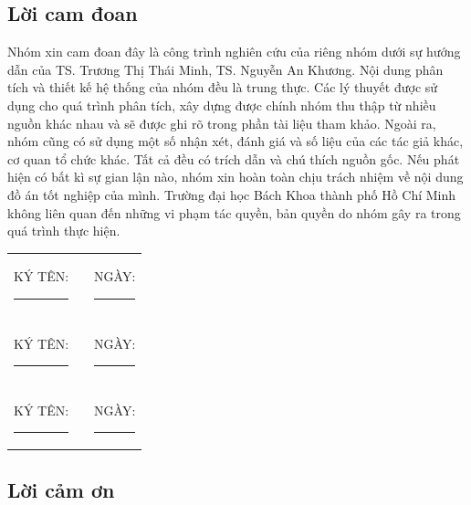 \documentclass[a4paper, oneside, 12pt]{report}
\theoremstyle{definition}
\begin{document}

\addtocounter{page}{1}

\setlength{\parskip}{2.5mm}
\thispagestyle{plain}
\begin{center}
	\section*{Lời cam đoan}
\end{center}

Nhóm xin cam đoan đây là công trình nghiên cứu của riêng nhóm dưới sự hướng dẫn của TS. Trương Thị Thái Minh, TS. Nguyễn An Khương. Nội dung phân tích và thiết kế hệ thống của nhóm đều là trung thực. Các lý thuyết được sử dụng cho quá trình phân tích, xây dựng được chính nhóm thu thập từ nhiều nguồn khác nhau và sẽ được ghi rõ trong phần tài liệu tham khảo. Ngoài ra, nhóm cũng có sử dụng một số nhận xét, đánh giá và số liệu của các tác giả khác, cơ quan tổ chức khác. Tất cả đều có trích dẫn và chú thích nguồn gốc. Nếu phát hiện có bất kì sự gian lận nào, nhóm xin hoàn toàn chịu trách nhiệm về nội dung đồ án tốt nghiệp của mình. Trường đại học Bách Khoa thành phố Hồ Chí Minh không liên quan đến những vi phạm tác quyền, bản quyền do nhóm gây ra trong quá trình thực hiện.

\vspace{1cm}

\begin{center}
	\begin{tabular}{c c c}
		KÝ TÊN: \rule{4cm}{0.15mm} & \hspace{4cm} & NGÀY: \rule{4cm}{0.15mm} \\ \\
		KÝ TÊN: \rule{4cm}{0.15mm} & \hspace{4cm} & NGÀY: \rule{4cm}{0.15mm} \\ \\
		KÝ TÊN: \rule{4cm}{0.15mm} & \hspace{4cm} & NGÀY: \rule{4cm}{0.15mm}
	\end{tabular}
\end{center}
\setlength{\parskip}{0mm}

\newpage

\setlength{\parskip}{2.5mm}
\thispagestyle{plain}
\begin{center}
	\section*{Lời cảm ơn}
\end{center}
\end{document}
